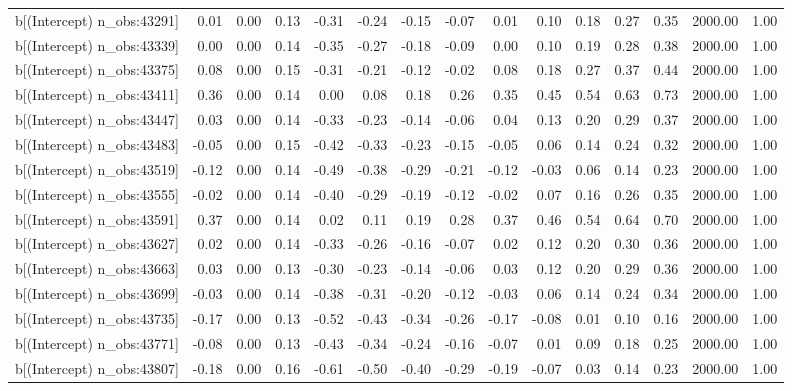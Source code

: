 \begin{table}[ht]
\begin{tabular}{rrrrrrrrrrrrrrr}
  b[(Intercept) n\_obs:43291] & 0.01 & 0.00 & 0.13 & -0.31 & -0.24 & -0.15 & -0.07 & 0.01 & 0.10 & 0.18 & 0.27 & 0.35 & 2000.00 & 1.00 \\ 
  b[(Intercept) n\_obs:43339] & 0.00 & 0.00 & 0.14 & -0.35 & -0.27 & -0.18 & -0.09 & 0.00 & 0.10 & 0.19 & 0.28 & 0.38 & 2000.00 & 1.00 \\ 
  b[(Intercept) n\_obs:43375] & 0.08 & 0.00 & 0.15 & -0.31 & -0.21 & -0.12 & -0.02 & 0.08 & 0.18 & 0.27 & 0.37 & 0.44 & 2000.00 & 1.00 \\ 
  b[(Intercept) n\_obs:43411] & 0.36 & 0.00 & 0.14 & 0.00 & 0.08 & 0.18 & 0.26 & 0.35 & 0.45 & 0.54 & 0.63 & 0.73 & 2000.00 & 1.00 \\ 
  b[(Intercept) n\_obs:43447] & 0.03 & 0.00 & 0.14 & -0.33 & -0.23 & -0.14 & -0.06 & 0.04 & 0.13 & 0.20 & 0.29 & 0.37 & 2000.00 & 1.00 \\ 
  b[(Intercept) n\_obs:43483] & -0.05 & 0.00 & 0.15 & -0.42 & -0.33 & -0.23 & -0.15 & -0.05 & 0.06 & 0.14 & 0.24 & 0.32 & 2000.00 & 1.00 \\ 
  b[(Intercept) n\_obs:43519] & -0.12 & 0.00 & 0.14 & -0.49 & -0.38 & -0.29 & -0.21 & -0.12 & -0.03 & 0.06 & 0.14 & 0.23 & 2000.00 & 1.00 \\ 
  b[(Intercept) n\_obs:43555] & -0.02 & 0.00 & 0.14 & -0.40 & -0.29 & -0.19 & -0.12 & -0.02 & 0.07 & 0.16 & 0.26 & 0.35 & 2000.00 & 1.00 \\ 
  b[(Intercept) n\_obs:43591] & 0.37 & 0.00 & 0.14 & 0.02 & 0.11 & 0.19 & 0.28 & 0.37 & 0.46 & 0.54 & 0.64 & 0.70 & 2000.00 & 1.00 \\ 
  b[(Intercept) n\_obs:43627] & 0.02 & 0.00 & 0.14 & -0.33 & -0.26 & -0.16 & -0.07 & 0.02 & 0.12 & 0.20 & 0.30 & 0.36 & 2000.00 & 1.00 \\ 
  b[(Intercept) n\_obs:43663] & 0.03 & 0.00 & 0.13 & -0.30 & -0.23 & -0.14 & -0.06 & 0.03 & 0.12 & 0.20 & 0.29 & 0.36 & 2000.00 & 1.00 \\ 
  b[(Intercept) n\_obs:43699] & -0.03 & 0.00 & 0.14 & -0.38 & -0.31 & -0.20 & -0.12 & -0.03 & 0.06 & 0.14 & 0.24 & 0.34 & 2000.00 & 1.00 \\ 
  b[(Intercept) n\_obs:43735] & -0.17 & 0.00 & 0.13 & -0.52 & -0.43 & -0.34 & -0.26 & -0.17 & -0.08 & 0.01 & 0.10 & 0.16 & 2000.00 & 1.00 \\ 
  b[(Intercept) n\_obs:43771] & -0.08 & 0.00 & 0.13 & -0.43 & -0.34 & -0.24 & -0.16 & -0.07 & 0.01 & 0.09 & 0.18 & 0.25 & 2000.00 & 1.00 \\ 
  b[(Intercept) n\_obs:43807] & -0.18 & 0.00 & 0.16 & -0.61 & -0.50 & -0.40 & -0.29 & -0.19 & -0.07 & 0.03 & 0.14 & 0.23 & 2000.00 & 1.00 \\ 

\end{tabular}
\end{table}

